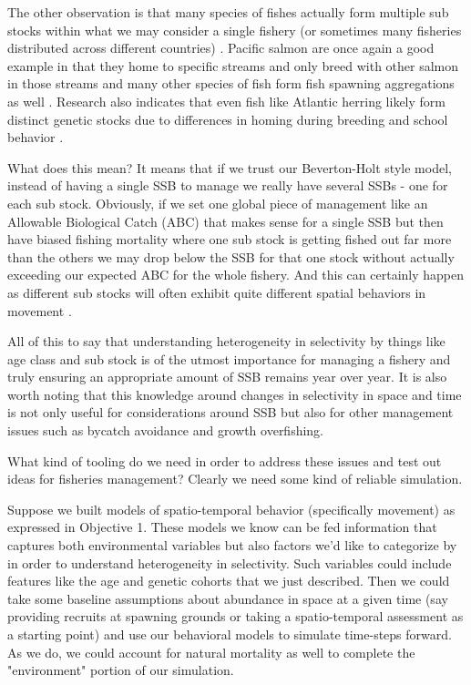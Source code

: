 \documentclass[11pt]{article}
\begin{document}
The other observation is that many species of fishes actually form multiple sub stocks within what we may consider a single fishery (or sometimes many fisheries distributed across different countries) \citep{lorenzen2010} \citep{salmonplan} \citep{prince2010}. Pacific salmon are once again a good example in that they home to specific streams and only breed with other salmon in those streams and many other species of fish form fish spawning aggregations as well \citep{erisman2017}. Research also indicates that even fish like Atlantic herring likely form distinct genetic stocks due to differences in homing during breeding and school behavior \citep{armstrong2001}. 

What does this mean? It means that if we trust our Beverton-Holt style model, instead of having a single SSB to manage we really have several SSBs - one for each sub stock. Obviously, if we set one global piece of management like an Allowable Biological Catch (ABC) that makes sense for a single SSB but then have biased fishing mortality where one sub stock is getting fished out far more than the others we may drop below the SSB for that one stock without actually exceeding our expected ABC for the whole fishery. And this can certainly happen as different sub stocks will often exhibit quite different spatial behaviors in movement \citep{tucker2019} \citep{punt2019} \citep{cadrin2020}. \newline

All of this to say that understanding heterogeneity in selectivity by things like age class and sub stock is of the utmost importance for managing a fishery and truly ensuring an appropriate amount of SSB remains year over year. It is also worth noting that this knowledge around changes in selectivity in space and time is not only useful for considerations around SSB but also for other management issues such as bycatch avoidance and growth overfishing. 

What kind of tooling do we need in order to address these issues and test out ideas for fisheries management? Clearly we need some kind of reliable simulation. \newline

Suppose we built models of spatio-temporal behavior (specifically movement) as expressed in Objective 1. These models we know can be fed information that captures both environmental variables but also factors we'd like to categorize by in order to understand heterogeneity in selectivity. Such variables could include features like the age and genetic cohorts that we just described. Then we could take some baseline assumptions about abundance in space at a given time (say providing recruits at spawning grounds or taking a spatio-temporal assessment as a starting point) and use our behavioral models to simulate time-steps forward. As we do, we could account for natural mortality as well to complete the "environment" portion of our simulation. 
\end{document}
